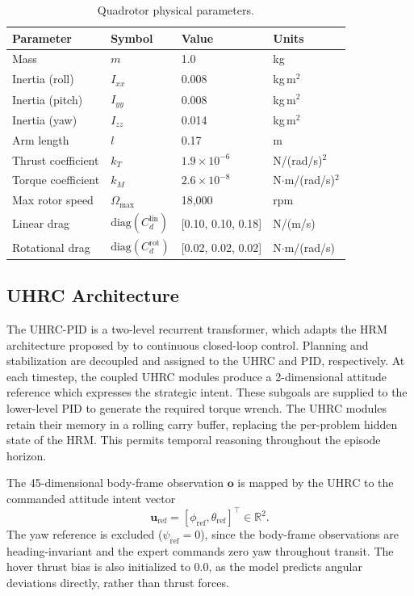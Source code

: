 \documentclass[12pt, a4paper]{article}
\begin{document}
\begin{table}[ht]
\centering
\caption{Quadrotor physical parameters.}
\label{tab:quad_params}
\begin{tabular}{llll}
\hline
Parameter & Symbol & Value & Units \\
\hline
Mass             & $m$       & 1.0  & kg \\
Inertia (roll)   & $I_{xx}$  & 0.008 & kg\,m$^2$ \\
Inertia (pitch)  & $I_{yy}$  & 0.008 & kg\,m$^2$ \\
Inertia (yaw)    & $I_{zz}$  & 0.014 & kg\,m$^2$ \\
Arm length       & $l$       & 0.17  & m \\
Thrust coefficient & $k_T$   & $1.9\times10^{-6}$ & N/(rad/s)$^2$ \\
Torque coefficient & $k_M$   & $2.6\times10^{-8}$ & N$\cdot$m/(rad/s)$^2$ \\
Max rotor speed  & $\Omega_{\max}$ & 18{,}000 & rpm \\
Linear drag      & $\mathrm{diag}(C_d^{\text{lin}})$ & [0.10, 0.10, 0.18] & N/(m/s) \\
Rotational drag  & $\mathrm{diag}(C_d^{\text{rot}})$ & [0.02, 0.02, 0.02] & N$\cdot$m/(rad/s) \\
\hline
\end{tabular}
\end{table}



\subsection{UHRC Architecture}
\label{sec:uhrc_arch}

The UHRC-PID is a two-level recurrent transformer, which adapts the HRM architecture proposed by \textcite{wang_hierarchical_2025} to continuous closed-loop control.
Planning and stabilization are decoupled and assigned to the UHRC and PID, respectively.
At each timestep, the coupled UHRC modules produce a 2-dimensional attitude reference which expresses the strategic intent.
These subgoals are supplied to the lower-level PID to generate the required torque wrench.
The UHRC modules retain their memory in a rolling carry buffer, replacing the per-problem hidden state of the HRM.
This permits temporal reasoning throughout the episode horizon.

The 45-dimensional body-frame observation $\mathbf{o}$ is mapped by the UHRC to the commanded attitude intent vector
\begin{equation}
    \mathbf{u}_{\mathrm{ref}} = [\phi_{\mathrm{ref}}, \theta_{\mathrm{ref}}]^{\top} \in \mathbb{R}^2.
\end{equation}
The yaw reference is excluded ($\psi_{\mathrm{ref}} = 0$), since the body-frame observations are heading-invariant and the expert commands zero yaw throughout transit.
The hover thrust bias is also initialized to $0.0$, as the model predicts angular deviations directly, rather than thrust forces.
\end{document}
